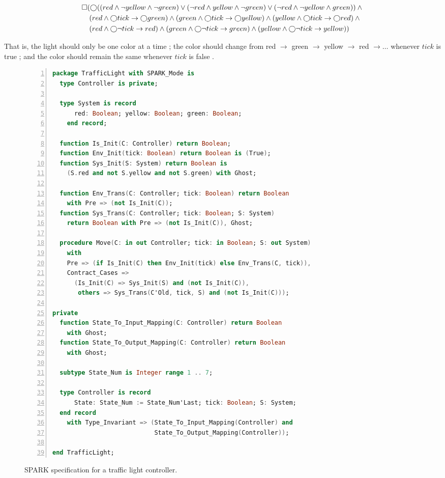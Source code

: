 \documentclass[runningheads]{llncs}
\begin{document}
{\scriptsize
\begin{align}
\square & (\varbigcirc ( (red \land \lnot yellow \land \lnot green) \lor (\lnot red \land yellow \land \lnot green) \lor (\lnot red \land \lnot yellow \land green)) \land \mbox{}  \label{eq:mutex} \\
	& \; (red \land \varbigcirc tick \rightarrow \varbigcirc green) \land (green \land \varbigcirc tick \rightarrow \varbigcirc yellow) \land (yellow \land \varbigcirc tick \rightarrow \varbigcirc red) \land \mbox{}  \label{eq:change} \\
	& \; (red \land \varbigcirc \lnot tick \rightarrow red) \land (green \land \varbigcirc \lnot tick \rightarrow green) \land (yellow \land \varbigcirc \lnot tick \rightarrow yellow) \label{eq:same})
\end{align}
}


\noindent That is, the light should only be one color at a time ; 
the color should change from red $\rightarrow$ green $\rightarrow$ yellow $\rightarrow$ red $\rightarrow \ldots$ whenever $tick$ is true ; 
and the color should remain the same whenever $tick$ is false .

\begin{figure}
\begin{lstlisting}[language={Ada}, basicstyle=\scriptsize, numbers=left]
package TrafficLight with SPARK_Mode is
  type Controller is private;
  
  type System is record
      red: Boolean; yellow: Boolean; green: Boolean;
    end record;
  
  function Is_Init(C: Controller) return Boolean;
  function Env_Init(tick: Boolean) return Boolean is (True);
  function Sys_Init(S: System) return Boolean is 
    (S.red and not S.yellow and not S.green) with Ghost;
    
  function Env_Trans(C: Controller; tick: Boolean) return Boolean
    with Pre => (not Is_Init(C));
  function Sys_Trans(C: Controller; tick: Boolean; S: System) 
    return Boolean with Pre => (not Is_Init(C)), Ghost;
    
  procedure Move(C: in out Controller; tick: in Boolean; S: out System)
    with 
    Pre => (if Is_Init(C) then Env_Init(tick) else Env_Trans(C, tick)),
    Contract_Cases =>
      (Is_Init(C) => Sys_Init(S) and (not Is_Init(C)),
       others => Sys_Trans(C'Old, tick, S) and (not Is_Init(C)));

private
  function State_To_Input_Mapping(C: Controller) return Boolean
    with Ghost;
  function State_To_Output_Mapping(C: Controller) return Boolean
    with Ghost;
  
  subtype State_Num is Integer range 1 .. 7;
  
  type Controller is record
      State: State_Num := State_Num'Last; tick: Boolean; S: System;
  end record
    with Type_Invariant => (State_To_Input_Mapping(Controller) and 
                            State_To_Output_Mapping(Controller));
      
end TrafficLight;
\end{lstlisting}
  \caption{SPARK specification for a traffic light controller.}
  \label{fig:trafficLightSpec}
\end{figure}
\end{document}
